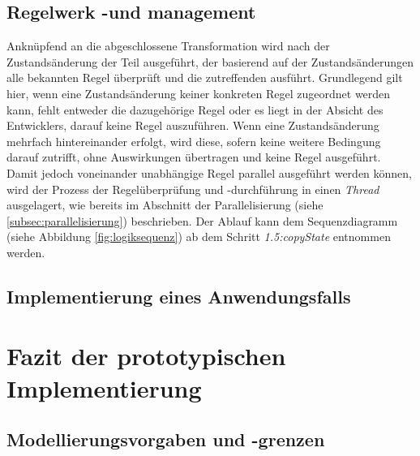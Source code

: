 \subsection{Regelwerk -und management}
    Anknüpfend an die abgeschlossene Transformation wird nach der Zustandsänderung der Teil ausgeführt, der basierend auf der Zustandsänderungen 
    alle bekannten Regel überprüft und die zutreffenden ausführt. Grundlegend gilt hier, wenn eine Zustandsänderung keiner konkreten Regel zugeordnet 
    werden kann, fehlt entweder die dazugehörige Regel oder es liegt in der Absicht des Entwicklers, darauf keine Regel auszuführen. Wenn eine 
    Zustandsänderung mehrfach hintereinander erfolgt, wird diese, sofern keine weitere Bedingung darauf zutrifft, ohne Auswirkungen übertragen 
    und keine Regel ausgeführt. Damit jedoch voneinander unabhängige Regel parallel ausgeführt werden können, wird der Prozess der Regelüberprüfung und -durchführung 
    in einen \textit{Thread} ausgelagert, wie bereits im Abschnitt der Parallelisierung (siehe \ref{subsec:parallelisierung}) beschrieben. Der Ablauf kann dem 
    Sequenzdiagramm (siehe Abbildung \ref{fig:logiksequenz}) ab dem Schritt \textit{1.5:copyState} entnommen werden. 


\subsection{Implementierung eines Anwendungsfalls}


\section{Fazit der prototypischen Implementierung}

\subsection{Modellierungsvorgaben und -grenzen}
\label{subsec:modellierungsgrenzen}


